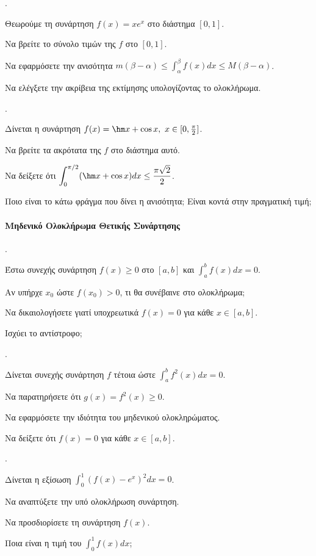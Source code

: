 \documentclass[11pt,a4paper,twocolumn]{article}
\newcounter{askhsh}
\newcommand{\askhsh}{\large\theaskhsh.\ \addtocounter{askhsh}{1}}
\begin{document}
\askhsh Θεωρούμε τη συνάρτηση $f(x) = x e^x$ στο διάστημα $[0, 1]$.
\begin{alist}
\item Να βρείτε το σύνολο τιμών της $f$ στο $[0, 1]$.
\item Να εφαρμόσετε την ανισότητα $m(\beta-\alpha) \le \int_\alpha^\beta f(x) dx \le M(\beta-\alpha)$.
\item Να ελέγξετε την ακρίβεια της εκτίμησης υπολογίζοντας το ολοκλήρωμα.
\end{alist}

\askhsh Δίνεται η συνάρτηση $f(x) = \hm x + \cos x, \ x \in [0, \frac{\pi}{2}]$.
\begin{alist}
\item Να βρείτε τα ακρότατα της $f$ στο διάστημα αυτό.
\item Να δείξετε ότι $\displaystyle \int_0^{\pi/2} (\hm x + \cos x) dx \le \frac{\pi\sqrt{2}}{2}$.
\item Ποιο είναι το κάτω φράγμα που δίνει η ανισότητα; Είναι κοντά στην πραγματική τιμή;
\end{alist}

\paragraph{Μηδενικό Ολοκλήρωμα Θετικής Συνάρτησης}

\askhsh Έστω συνεχής συνάρτηση $f(x) \ge 0$ στο $[a,b]$ και $\int_a^b f(x) dx = 0$.
\begin{alist}
\item Αν υπήρχε $x_0$ ώστε $f(x_0) > 0$, τι θα συνέβαινε στο ολοκλήρωμα;
\item Να δικαιολογήσετε γιατί υποχρεωτικά $f(x) = 0$ για κάθε $x \in [a,b]$.
\item Ισχύει το αντίστροφο;
\end{alist}

\askhsh Δίνεται συνεχής συνάρτηση $f$ τέτοια ώστε $\int_a^b f^2(x) dx = 0$.
\begin{alist}
\item Να παρατηρήσετε ότι $g(x) = f^2(x) \ge 0$.
\item Να εφαρμόσετε την ιδιότητα του μηδενικού ολοκληρώματος.
\item Να δείξετε ότι $f(x) = 0$ για κάθε $x \in [a,b]$.
\end{alist}

\askhsh Δίνεται η εξίσωση $\int_0^1 (f(x) - e^x)^2 dx = 0$.
\begin{alist}
\item Να αναπτύξετε την υπό ολοκλήρωση συνάρτηση.
\item Να προσδιορίσετε τη συνάρτηση $f(x)$.
\item Ποια είναι η τιμή του $\int_0^1 f(x) dx$;
\end{alist}
\end{document}
